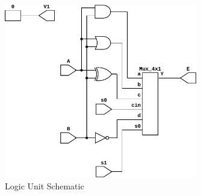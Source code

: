 \documentclass{article}
\begin{document}
\begin{figure}[H]
  \begin{center}
    \includegraphics[width=0.75\textwidth]{figures/LogicUnit-1bit.pdf}
  \end{center}
  \caption{Logic Unit Schematic}
\end{figure}
\end{document}
